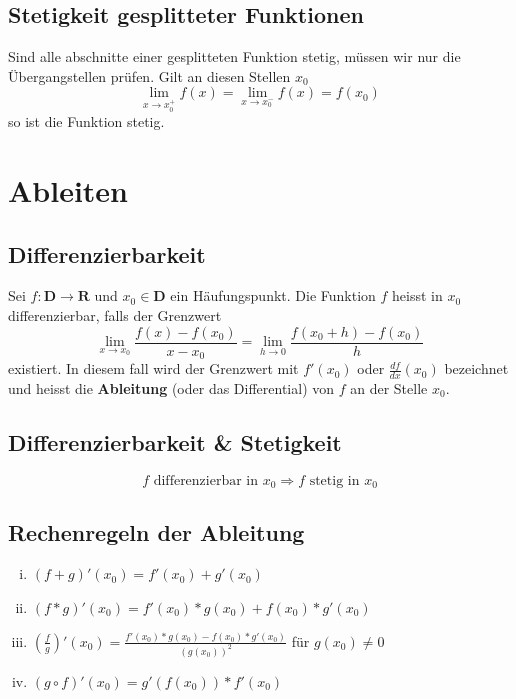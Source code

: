 \documentclass[8pt]{extarticle}
\begin{document}
\begin{multicols*}{3}
\subsection{Stetigkeit gesplitteter Funktionen}

Sind alle abschnitte einer gesplitteten Funktion stetig, müssen wir nur die Übergangstellen prüfen.
Gilt an diesen Stellen $x_0$ $$\lim_{x \rightarrow x_0^+} f(x) = \lim_{x \rightarrow x_0^-} f(x) = f(x_0)$$
so ist die Funktion stetig.
\newpage
\section{Ableiten}
\hypertarget{sec:3}{}

\subsection{Differenzierbarkeit}

Sei $f: \mathbf{D} \rightarrow \mathbf{R}$ und $x_0 \in \mathbf{D}$ ein Häufungspunkt.
Die Funktion $f$ heisst in $x_0$ differenzierbar, falls der Grenzwert $$\lim_{x \rightarrow x_0} \frac{f(x) - f(x_0)}{x - x_0} = \lim_{h \rightarrow 0} \frac{f(x_0 + h) - f(x_0)}{h}$$
existiert. In diesem fall wird der Grenzwert mit $f'(x_0)$ oder $\frac{df}{dx} (x_0)$ bezeichnet und heisst die \textbf{Ableitung}
(oder das Differential) von $f$ an der Stelle $x_0$.

\subsection{Differenzierbarkeit \& Stetigkeit}

$$
  f \text{ differenzierbar in } x_0 \Rightarrow f \text{ stetig in } x_0
$$

\subsection{Rechenregeln der Ableitung}

\begin{enumerate}[(i)]
  \item $(f + g)'(x_0) = f'(x_0) + g'(x_0)$
  \item $(f * g)'(x_0) = f'(x_0)*g(x_0) + f(x_0)*g'(x_0)$
  \item $(\frac{f}{g})'(x_0) = \frac{f'(x_0) * g(x_0) - f(x_0) * g'(x_0)}{(g(x_0))^2}$ für $g(x_0) \neq 0$
  \item $(g \circ f)'(x_0) = g'(f(x_0)) * f'(x_0)$
\end{enumerate}


\end{multicols*}
\end{document}
